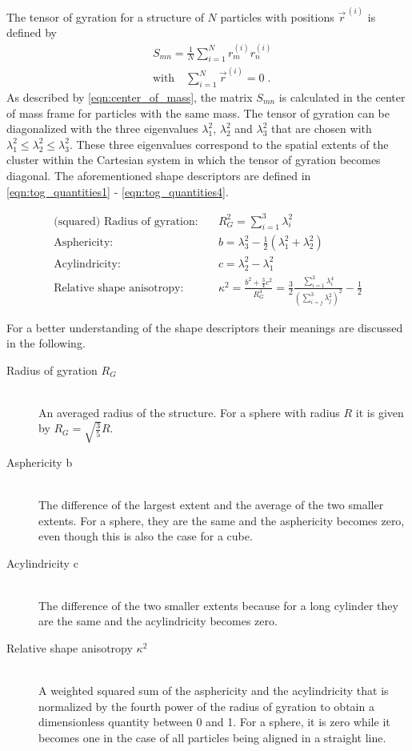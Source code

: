 The tensor of gyration for a structure of $N$ particles with positions $\vec{r}^{\,(i)}$ is defined by
\begin{align}
\label{eqn:tensor_of_gyration}
&S_{mn}=\frac{1}{N} \sum_{i=1}^{N} r^{(i)}_m r^{(i)}_n\\
\label{eqn:center_of_mass}
&\text{with} \quad \sum_{i=1}^{N} \vec{r}^{(i)} = 0 \; \text{.}
\end{align}
As described by \autoref{eqn:center_of_mass}, the matrix $S_{mn}$ is calculated in the center of mass frame for particles with the same mass. The tensor of gyration can be diagonalized with the three eigenvalues $\lambda_1^2$, $\lambda_2^2$ and $\lambda_3^2$ that are chosen with $\lambda_1^2 \leq \lambda_2^2 \leq \lambda_3^2 $. These three eigenvalues correspond to the spatial extents of the cluster within the Cartesian system in which the tensor of gyration becomes diagonal. The aforementioned shape descriptors are defined in \autoref{eqn:tog_quantities1} - \ref{eqn:tog_quantities4}.

\begin{align}
\label{eqn:tog_quantities1}
\text{(squared) Radius of gyration:} \quad &R_G^2 = \sum_{i=1}^3 \lambda_i^2\\
\label{eqn:tog_quantities2}
\text{Asphericity:} \quad &b = \lambda_3^2 - \frac{1}{2}(\lambda_1^2+\lambda_2^2)\\
\label{eqn:tog_quantities3}
\text{Acylindricity:} \quad &c = \lambda_2^2 - \lambda_1^2\\
\label{eqn:tog_quantities4}
\text{Relative shape anisotropy:} \quad &\kappa^2 = \frac{b^2 + \frac{3}{4} c^2 }{R_G^4} =  \frac{3}{2} \frac{ \sum_{i=1}^3 \lambda_i^4 }{\left(\sum_{i=j}^3 \lambda_j^2 \right) ^2 } - \frac{1}{2}
\end{align}

For a better understanding of the shape descriptors their meanings are discussed in the following.

\begin{description}
\item[Radius of gyration $R_G$] \hfill \\ An averaged radius of the structure. For a sphere with radius $R$ it is given by $R_G = \sqrt{\frac{3}{5}} R$.
\item[Asphericity b]\hfill \\ The difference of the largest extent and the average of the two smaller extents. For a sphere, they are the same and the asphericity becomes zero, even though this is also the case for a cube.  
\newpage
\item[Acylindricity c] \hfill \\ The difference of the two smaller extents because for a long cylinder they are the same and the acylindricity becomes zero.
\item[Relative shape anisotropy $\kappa^2$] \hfill \\ A weighted squared sum of the asphericity and the acylindricity that is normalized by the fourth power of the radius of gyration to obtain a dimensionless quantity between 0 and 1. For a sphere, it is zero while it becomes one in the case of all particles being aligned in a straight line.
\end{description}

